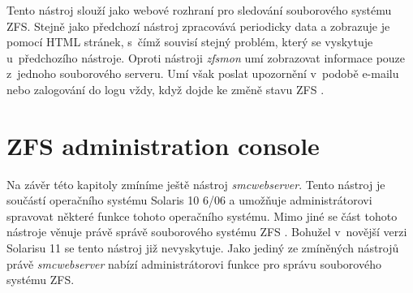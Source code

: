 Tento nástroj slouží jako webové rozhraní pro sledování souborového systému ZFS. Stejně jako předchozí nástroj zpracovává periodicky data a zobrazuje je pomocí HTML stránek, s~čímž souvisí stejný problém, který se vyskytuje u~předchozího nástroje. Oproti nástroji \emph{zfsmon} umí zobrazovat informace pouze z~jednoho souborového serveru. Umí však poslat upozornění v~podobě e-mailu nebo zalogování do logu vždy, když dojde ke změně stavu ZFS \cite{zfswatcher}.
\section{ZFS administration console}
Na závěr této kapitoly zmíníme ještě nástroj \emph{smcwebserver}. Tento nástroj je součástí operačního systému Solaris 10 6/06 a umožňuje administrátorovi spravovat některé funkce tohoto operačního systému. Mimo jiné se část tohoto nástroje věnuje právě správě souborového systému ZFS \cite{smc}. Bohužel v~novější verzi Solarisu 11 se tento nástroj již nevyskytuje. Jako jediný ze zmíněných nástrojů právě \emph{smcwebserver} nabízí administrátorovi funkce pro správu souborového systému ZFS. 